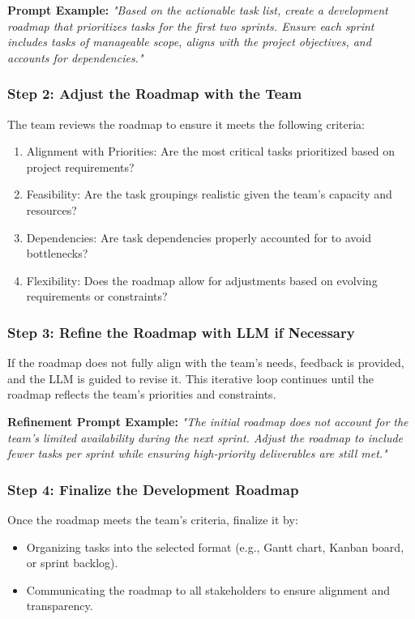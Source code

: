 \documentclass[14pt, a4paper]{article}
\begin{document}
\textbf{Prompt Example:} \textit{"Based on the actionable task list, create a
development roadmap that prioritizes tasks for the first two sprints. Ensure
each sprint includes tasks of manageable scope, aligns with the project
objectives, and accounts for dependencies."}

\subsubsection*{Step 2: Adjust the Roadmap with the Team}

The team reviews the roadmap to ensure it meets the following criteria:

\begin{enumerate}
    \item Alignment with Priorities: Are the most critical tasks prioritized
    based on project requirements?
    \item Feasibility: Are the task groupings realistic given the team’s
    capacity and resources?
    \item Dependencies: Are task dependencies properly accounted for to avoid
    bottlenecks?
    \item Flexibility: Does the roadmap allow for adjustments based on evolving
    requirements or constraints?
\end{enumerate}

\subsubsection*{Step 3: Refine the Roadmap with LLM if Necessary}

If the roadmap does not fully align with the team’s needs, feedback is provided,
and the LLM is guided to revise it. This iterative loop continues until the
roadmap reflects the team’s priorities and constraints.

\textbf{Refinement Prompt Example:} \textit{"The initial roadmap does not
account for the team’s limited availability during the next sprint. Adjust the
roadmap to include fewer tasks per sprint while ensuring high-priority
deliverables are still met."}

\subsubsection*{Step 4: Finalize the Development Roadmap}

Once the roadmap meets the team’s criteria, finalize it by:

\begin{itemize}
    \item Organizing tasks into the selected format (e.g., Gantt chart, Kanban
    board, or sprint backlog).
    \item Communicating the roadmap to all stakeholders to ensure alignment and
    transparency.
\end{itemize}
\end{document}

